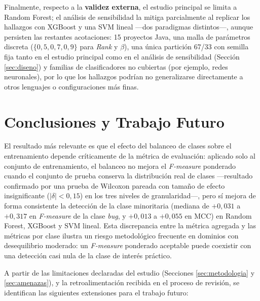 \documentclass[conference,a4paper]{IEEEtran}
\begin{document}
Finalmente, respecto a la \textbf{validez externa}, el estudio principal se limita a Random Forest; el análisis de sensibilidad la mitiga parcialmente al replicar los hallazgos con XGBoost y una SVM lineal ---dos paradigmas distintos---, aunque persisten las restantes acotaciones: 15 proyectos Java, una malla de parámetros discreta ($\{0{,}5, 0{,}7, 0{,}9\}$ para \textit{Rank} y $\beta$), una única partición 67/33 con semilla fija tanto en el estudio principal como en el análisis de sensibilidad (Sección \ref{sec:diseno}) y familias de clasificadores no cubiertas (por ejemplo, redes neuronales), por lo que los hallazgos podrían no generalizarse directamente a otros lenguajes o configuraciones más finas.

\section{Conclusiones y Trabajo Futuro}
\label{sec:conclusiones}

El resultado más relevante es que el efecto del balanceo de clases sobre el entrenamiento depende críticamente de la métrica de evaluación: aplicado solo al conjunto de entrenamiento, el balanceo no mejora el \textit{F-measure} ponderado cuando el conjunto de prueba conserva la distribución real de clases ---resultado confirmado por una prueba de Wilcoxon pareada con tamaño de efecto insignificante ($|\delta| < 0{,}15$) en los tres niveles de granularidad---, pero sí mejora de forma consistente la detección de la clase minoritaria (mediana de $+0{,}031$ a $+0{,}317$ en \textit{F-measure} de la clase \textit{bug}, y $+0{,}013$ a $+0{,}055$ en MCC) en Random Forest, XGBoost y SVM lineal. Esta discrepancia entre la métrica agregada y las métricas por clase ilustra un riesgo metodológico frecuente en dominios con desequilibrio moderado: un \textit{F-measure} ponderado aceptable puede coexistir con una detección casi nula de la clase de interés práctico.

A partir de las limitaciones declaradas del estudio (Secciones \ref{sec:metodologia} y \ref{sec:amenazas}), y la retroalimentación recibida en el proceso de revisión, se identifican las siguientes extensiones para el trabajo futuro:
\end{document}
